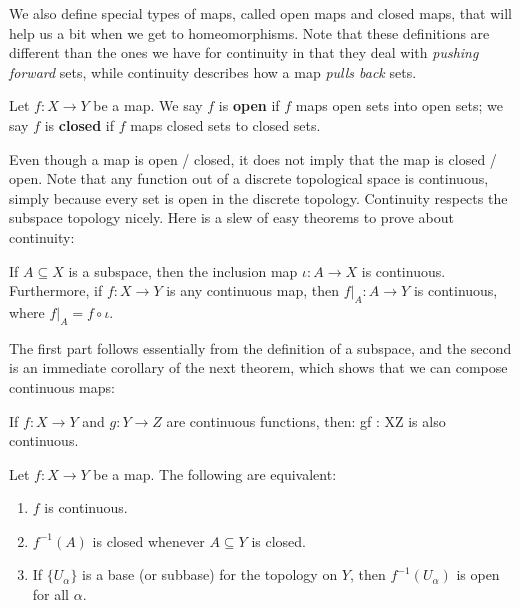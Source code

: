 	We also define special types of maps, called open maps and closed maps, that will help us a bit when we get to homeomorphisms. Note that these definitions are different than the ones we have for continuity in that they deal with \textit{pushing forward} sets, while continuity describes how a map \textit{pulls back} sets. 
	
	\begin{definition}
		Let $f : X\rightarrow Y$ be a map. We say $f$ is \textbf{open} if $f$ maps open sets into open sets; we say $f$ is \textbf{closed} if $f$ maps closed sets 
		to closed sets.
	\end{definition}
	
	Even though a map is open / closed, it does not imply that the map is closed / open. Note that any function out of a discrete topological space is continuous, 
	simply because every set is open in the discrete topology. Continuity respects the subspace topology nicely. Here is a slew of easy theorems to prove about 
	continuity:
	
	\begin{theorem}
		If $A\subseteq X$ is a subspace, then the inclusion map $\iota : A\rightarrow X$ is continuous. Furthermore, if $f : X\rightarrow Y$ is any continuous 
		map, then $f|_A : A\rightarrow Y$ is continuous, where $f|_A = f\circ\iota$.
	\end{theorem}
	
	The first part follows essentially from the definition of a subspace, and the second is an immediate corollary of the next theorem, which shows that we can 
	compose continuous maps:
	
	\begin{theorem}
		If $f : X\rightarrow Y$ and $g : Y\rightarrow Z$ are continuous functions, then:
		\eq
			g\circ f : X\rightarrow Z
		\qe
		is also continuous.
	\end{theorem}
	
	\begin{theorem}
		Let $f : X\rightarrow Y$ be a map. The following are equivalent:
		\begin{enumerate}
			\item $f$ is continuous. 
			\item $f^{-1}(A)$ is closed whenever $A\subseteq Y$ is closed. 
			\item If $\{U_\alpha\}$ is a base (or subbase) for the topology on $Y$, then $f^{-1}(U_\alpha)$ is open for all $\alpha$.
		\end{enumerate}
	\end{theorem}
	
